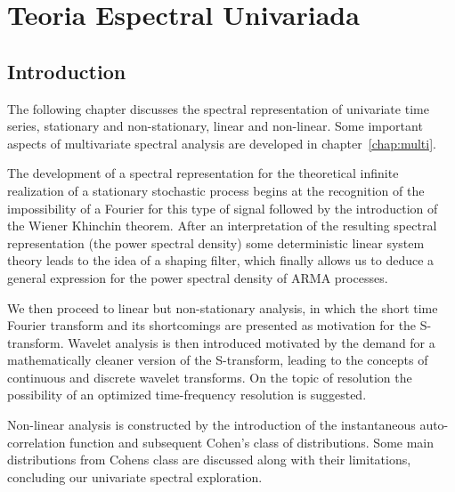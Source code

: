 \chapter{Teoria Espectral Univariada}

\section*{Introduction}

The following chapter discusses the spectral representation of univariate time
series, stationary and non-stationary, linear and non-linear. Some important
aspects of multivariate spectral analysis are developed in
chapter~\ref{chap:multi}.

The development of a spectral representation for the theoretical infinite
realization of a stationary stochastic process begins at the recognition of the
impossibility of a Fourier for this type of signal followed by the introduction
of the Wiener Khinchin theorem. After an interpretation of the resulting
spectral representation (the power spectral density) some deterministic linear
system theory leads to the idea of a shaping filter, which finally allows us to
deduce a general expression for the power spectral density of ARMA processes.

We then proceed to linear but non-stationary analysis, in which the short time
Fourier transform and its shortcomings are presented as motivation for the
S-transform. Wavelet analysis is then introduced motivated by the demand for a
mathematically cleaner version of the S-transform, leading to the concepts of
continuous and discrete wavelet transforms. On the topic of resolution the
possibility of an optimized time-frequency resolution is suggested.

Non-linear analysis is constructed by the introduction of the instantaneous
auto-correlation function and subsequent Cohen's class of distributions. Some
main distributions from Cohens class are discussed along with their
limitations, concluding our univariate spectral exploration.
